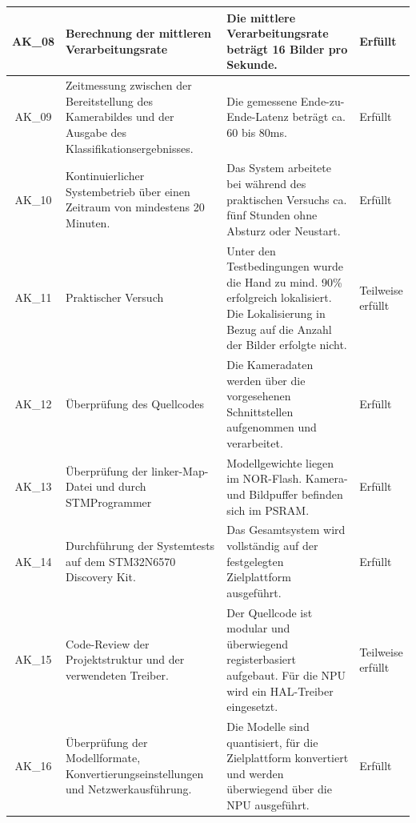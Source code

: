 \begin{longtable}{|c|p{}|p{}|p{}|}
    AK\_08 & 
    Berechnung der mittleren Verarbeitungsrate  &
    Die mittlere Verarbeitungsrate beträgt 16 Bilder pro Sekunde. &
    Erfüllt \\
    \hline

    AK\_09 &
    Zeitmessung zwischen der Bereitstellung des Kamerabildes und der Ausgabe des Klassifikationsergebnisses. &
    Die gemessene Ende-zu-Ende-Latenz beträgt ca. 60 bis 80ms. &
    Erfüllt \\
    \hline

    AK\_10 &
    Kontinuierlicher Systembetrieb über einen Zeitraum von mindestens 20 Minuten. &
    Das System arbeitete bei während des praktischen Versuchs ca. fünf Stunden ohne Absturz oder Neustart. &
    Erfüllt \\
    \hline

    AK\_11 &
    Praktischer Versuch & Unter den Testbedingungen wurde die Hand zu mind. 90\% erfolgreich lokalisiert. Die Lokalisierung in Bezug auf die Anzahl der Bilder erfolgte nicht. &
    Teilweise erfüllt\\
    \hline

    AK\_12 &
    Überprüfung des Quellcodes &
    Die Kameradaten werden über die vorgesehenen Schnittstellen aufgenommen und verarbeitet. &
    Erfüllt \\
    \hline

    AK\_13 &
    Überprüfung der linker-Map-Datei und durch STMProgrammer &
    Modellgewichte liegen im NOR-Flash. Kamera- und Bildpuffer befinden sich im PSRAM. &
    Erfüllt \\
    \hline

    AK\_14 &
    Durchführung der Systemtests auf dem STM32N6570 Discovery Kit. &
    Das Gesamtsystem wird vollständig auf der festgelegten Zielplattform ausgeführt. &
    Erfüllt \\
    \hline

    AK\_15 &
    Code-Review der Projektstruktur und der verwendeten Treiber. &
    Der Quellcode ist modular und überwiegend registerbasiert aufgebaut. Für die NPU wird ein HAL-Treiber eingesetzt. &
    Teilweise erfüllt \\
    \hline

    AK\_16 &
    Überprüfung der Modellformate, Konvertierungseinstellungen und Netzwerkausführung. &
    Die Modelle sind quantisiert, für die Zielplattform konvertiert und werden überwiegend über die NPU ausgeführt. &
    Erfüllt \\
    \hline
\end{longtable}

